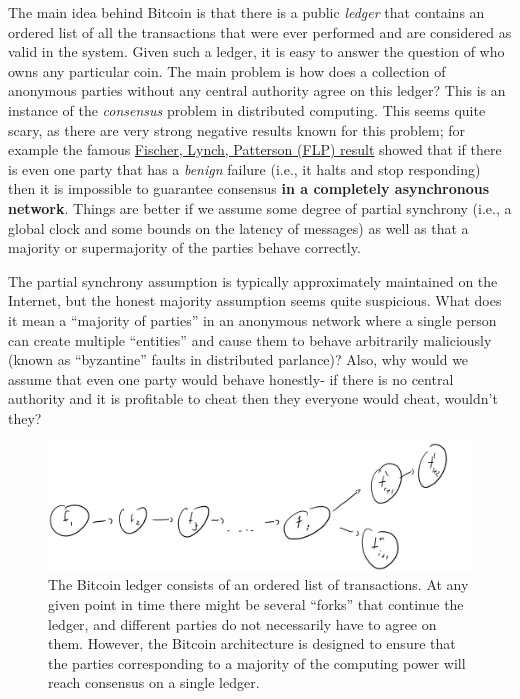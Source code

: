 The main idea behind Bitcoin is that there is a public \emph{ledger}
that contains an ordered list of all the transactions that were ever
performed and are considered as valid in the system. Given such a
ledger, it is easy to answer the question of who owns any particular
coin. The main problem is how does a collection of anonymous parties
without any central authority agree on this ledger? This is an instance
of the \emph{consensus} problem in distributed computing. This seems
quite scary, as there are very strong negative results known for this
problem; for example the famous
\href{http://the-paper-trail.org/blog/a-brief-tour-of-flp-impossibility/}{Fischer,
Lynch, Patterson (FLP) result} showed that if there is even one party
that has a \emph{benign} failure (i.e., it halts and stop responding)
then it is impossible to guarantee consensus \textbf{in a completely
asynchronous network}. Things are better if we assume some degree of
partial synchrony (i.e., a global clock and some bounds on the latency
of messages) as well as that a majority or supermajority of the parties
behave correctly.

The partial synchrony assumption is typically approximately maintained
on the Internet, but the honest majority assumption seems quite
suspicious. What does it mean a ``majority of parties'' in an anonymous
network where a single person can create multiple ``entities'' and cause
them to behave arbitrarily maliciously (known as ``byzantine'' faults in
distributed parlance)? Also, why would we assume that even one party
would behave honestly- if there is no central authority and it is
profitable to cheat then they everyone would cheat, wouldn't they?

\begin{figure}
\centering
\includegraphics[width=\textwidth, height=0.25\paperheight, keepaspectratio]{../figure/Bitcoin_ledger.jpg}
\caption{The Bitcoin ledger consists of an ordered list of transactions.
At any given point in time there might be several ``forks'' that
continue the ledger, and different parties do not necessarily have to
agree on them. However, the Bitcoin architecture is designed to ensure
that the parties corresponding to a majority of the computing power will
reach consensus on a single ledger.}
\label{ledgerfig}
\end{figure}

